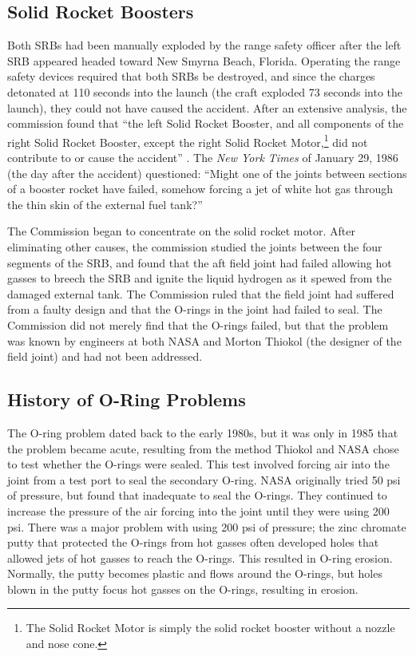 \subsection{Solid Rocket Boosters}

Both SRBs had been manually exploded by the range safety officer
after the left SRB appeared headed toward New Smyrna Beach,
Florida.
Operating the range safety devices required that both SRBs
be destroyed, and since the charges detonated at 110 seconds
into the launch (the craft exploded 73 seconds into the
launch), they could not have caused the accident.
After an extensive analysis, the commission found that ``the
left Solid Rocket Booster, and all components of the right
Solid Rocket Booster, except the right Solid Rocket
Motor,\footnote{The Solid Rocket Motor is simply the solid
rocket booster without a nozzle and nose cone.}
did not contribute to or cause the accident''
\cite[vol 1, p. 53]{rogers}.  The {\em New York Times} of
January 29, 1986 (the day after the accident) questioned:
``Might one of the joints between sections of a booster rocket have failed,
somehow forcing a jet of white hot gas through the thin skin
of the external fuel tank?'' \cite{nytexternal}

The Commission began to concentrate on the solid rocket
motor.
After eliminating other causes, the commission studied the
joints between the four segments of the SRB, and found that
the aft field joint had failed allowing hot gasses to breech
the SRB and ignite the liquid hydrogen as it spewed from the
damaged external tank.
The Commission ruled that the field joint had suffered from
a faulty design and that the O-rings in the joint had failed
to seal.
The Commission did not merely find that the O-rings failed,
but that the problem was known by engineers at both NASA and
Morton Thiokol (the designer of the field joint) and had not
been addressed.

\subsection{History of O-Ring Problems}

The O-ring problem dated back to the early 1980s, but it was
only in 1985 that the problem became acute, resulting from
the method Thiokol and NASA chose to test whether the
O-rings were sealed.
This test involved forcing air into the joint from a test
port to seal the secondary O-ring.
NASA originally tried 50 psi of pressure, but found that
inadequate to seal the O-rings.
They continued to increase the pressure of the air forcing
into the joint until they were using 200 psi.
There was a major problem with using 200 psi of pressure;
the zinc chromate putty that protected the O-rings from hot
gasses often developed holes that allowed jets of hot gasses to
reach the O-rings.
This resulted in O-ring erosion.  Normally, the putty
becomes plastic and flows around the O-rings, but holes
blown in the putty focus hot gasses on
the O-rings, resulting in erosion.

